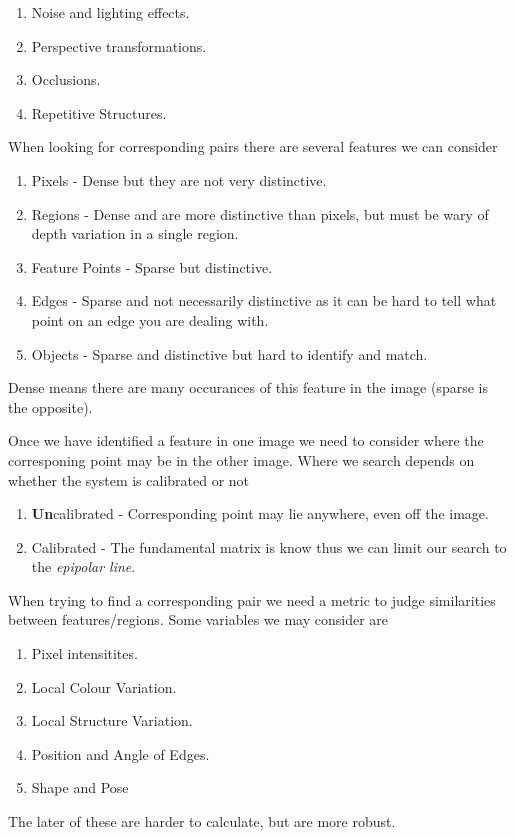 \documentclass[11pt,a4paper]{article}
\begin{document}
\begin{enumerate}
	\item Noise and lighting effects.
	\item Perspective transformations.
	\item Occlusions.
	\item Repetitive Structures.
\end{enumerate}

When looking for corresponding pairs there are several features we can consider
\begin{enumerate}
	\item Pixels - Dense but they are not very distinctive.
	\item Regions - Dense and are more distinctive than pixels, but must be wary of depth variation in a single region.
	\item Feature Points - Sparse but distinctive.
	\item Edges - Sparse and not necessarily distinctive as it can be hard to tell what point on an edge you are dealing with.
	\item Objects - Sparse and distinctive but hard to identify and match.
\end{enumerate}
\nb Dense means there are many occurances of this feature in the image (sparse is the opposite).

Once we have identified a feature in one image we need to consider where the corresponing point may be in the other image. Where we search depends on whether the system is calibrated or not
\begin{enumerate}
	\item \textbf{Un}calibrated - Corresponding point may lie anywhere, even off the image.
	\item Calibrated - The fundamental matrix is know thus we can limit our search to the \textit{epipolar line}.
\end{enumerate}

When trying to find a corresponding pair we need a metric to judge similarities between features/regions. Some variables we may consider are
\begin{enumerate}
	\item Pixel intensitites.
	\item Local Colour Variation.
	\item Local Structure Variation.
	\item Position and Angle of Edges.
	\item Shape and Pose
\end{enumerate}
\nb The later of these are harder to calculate, but are more robust.\\
\end{document}
